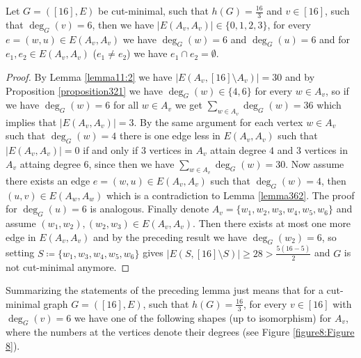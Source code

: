 \begin{lem}\label{lemma364}
Let \(G=([16],E)\) be cut-minimal, such that \(h(G)=\frac{16}{3}\) and \(v\in [16]\), such that \(\deg_G(v)=6\), then we have \(|E(A_v,A_v)|\in\{0,1,2,3\}\), for every \(e=(w,u)\in E(A_v,A_v)\) we have \(\deg_G(w)=6\) and \(\deg_G(u)=6\) and for \(e_1,e_2\in E(A_v,A_v)\) (\(e_1\neq e_2\)) we have \(e_1\cap e_2=\emptyset\).
\begin{proof}
By Lemma \ref{lemma11:2} we have \(|E(A_v,[16]\setminus A_v)|=30\) and by Proposition \ref{proposition321} we have \(\deg_G(w)\in\{4,6\}\) for every \(w\in A_v\), so if we have \(\deg_G(w)=6\) for all \(w\in A_v\) we get \(\sum\limits_{w\in A_v}\deg_G(w)=36\) which implies that \(|E(A_v,A_v)|=3\). By the same argument for each vertex \(w\in A_v\) such that \(\deg_G(w)=4\) there is one edge less in \(E(A_v,A_v)\) such that \(|E(A_v,A_v)|=0\) if and only if \(3\) vertices in \(A_v\) attain degree \(4\) and \(3\) vertices in \(A_v\) attaing degree \(6\), since then we have \(\sum\limits_{w\in A_v}\deg_G(w)=30\). Now assume there exists an edge \(e=(w,u)\in E(A_v,A_v)\) such that \(\deg_G(w)=4\), then \((u,v)\in E(A_w,A_w)\) which is a contradiction to Lemma \ref{lemma362}. The proof for \(\deg_G(u)=6\) is analogous. Finally denote \(A_v=\{w_1,w_2,w_3,w_4,w_5,w_6\}\) and assume \((w_1,w_2),(w_2,w_3)\in E(A_v,A_v)\). Then there exists at most one more edge in \(E(A_v,A_v)\) and by the preceding result we have \(\deg_G(w_2)=6\), so setting \(S\coloneqq\{w_1,w_3,w_4,w_5,w_6\}\) gives \(|E(S,[16]\setminus S)|\geq 28>\frac{5(16-5)}{2}\) and \(G\) is not cut-minimal anymore.
\end{proof}
\end{lem}

Summarizing the statements of the preceding lemma just means that for a cut-minimal graph \(G=([16],E)\), such that \(h(G)=\frac{16}{3}\), for every \(v\in [16]\) with \(\deg_G(v)=6\) we have one of the following shapes (up to isomorphism) for \(A_v\), where the numbers at the vertices denote their degrees (see Figure \ref{figure8:Figure 8}).

\newpage



